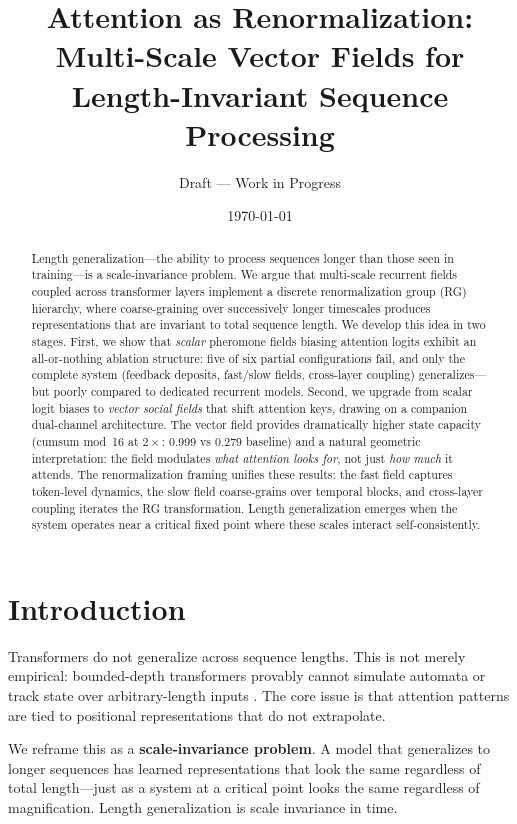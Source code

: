 \documentclass[11pt,a4paper]{article}
\title{%
  Attention as Renormalization:\\
  Multi-Scale Vector Fields for\\
  Length-Invariant Sequence Processing%
}
\author{
  Draft --- Work in Progress
}
\date{\today}
\begin{document}
\maketitle

\begin{abstract}
Length generalization---the ability to process sequences longer than
those seen in training---is a scale-invariance problem.  We argue
that multi-scale recurrent fields coupled across transformer layers
implement a discrete renormalization group (RG) hierarchy, where
coarse-graining over successively longer timescales produces
representations that are invariant to total sequence length.  We
develop this idea in two stages.  First, we show that \emph{scalar}
pheromone fields biasing attention logits exhibit an all-or-nothing
ablation structure: five of six partial configurations fail, and only
the complete system (feedback deposits, fast/slow fields, cross-layer
coupling) generalizes---but poorly compared to dedicated recurrent
models.  Second, we upgrade from scalar logit biases to \emph{vector
social fields} that shift attention keys, drawing on a companion
dual-channel architecture.  The vector field provides dramatically
higher state capacity (cumsum mod~16 at $2\times$: 0.999 vs 0.279
baseline) and a natural geometric interpretation: the field modulates
\emph{what attention looks for}, not just \emph{how much} it attends.
The renormalization framing unifies these results: the fast field
captures token-level dynamics, the slow field coarse-grains over
temporal blocks, and cross-layer coupling iterates the RG
transformation.  Length generalization emerges when the system
operates near a critical fixed point where these scales interact
self-consistently.
\end{abstract}


\section{Introduction}
\label{sec:intro}

Transformers do not generalize across sequence lengths.  This is not
merely empirical: bounded-depth transformers provably cannot simulate
automata or track state over arbitrary-length inputs
\citep{merrill2023transformers}.  The core issue is that attention
patterns are tied to positional representations that do not
extrapolate.

We reframe this as a \textbf{scale-invariance problem}.  A model that
generalizes to longer sequences has learned representations that look
the same regardless of total length---just as a system at a critical
point looks the same regardless of magnification.  Length
generalization is scale invariance in time.
\end{document}

